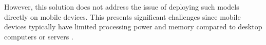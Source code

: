 \documentclass[licencjacka,en]{docs/pracamgr}
\begin{document}
However, this solution does not address the issue of deploying such models directly on mobile devices. This presents significant challenges since mobile devices typically have limited processing power and memory compared to desktop computers or servers \cite{mobile_resources}. 




 
\end{document}
